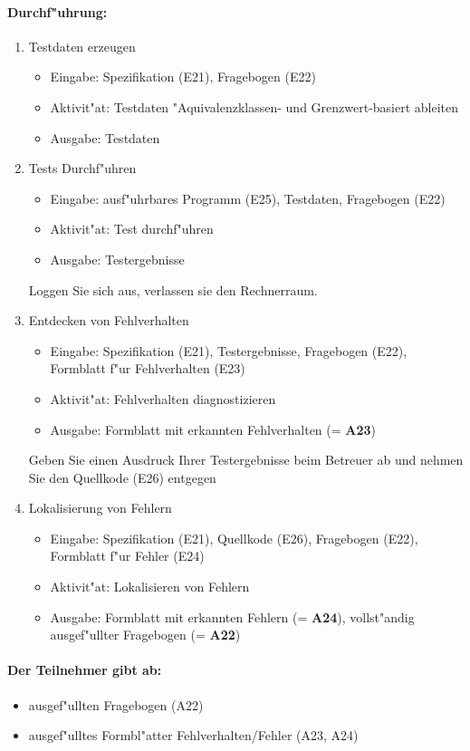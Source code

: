 \paragraph{Durchf"uhrung:} 
\begin{enumerate}
	\item Testdaten erzeugen
	\begin{itemize}
		\item Eingabe: Spezifikation (E21), Fragebogen (E22)
		\item Aktivit"at: Testdaten "Aquivalenzklassen- und Grenzwert-basiert
			ableiten
		\item Ausgabe: Testdaten
	\end{itemize}
	\item Tests Durchf"uhren
	\begin{itemize}
		\item Eingabe: ausf"uhrbares Programm (E25), Testdaten, Fragebogen (E22)
		\item Aktivit"at: Test durchf"uhren
		\item Ausgabe: Testergebnisse
	\end{itemize}
	Loggen Sie sich aus, verlassen sie den Rechnerraum.
	\item Entdecken von Fehlverhalten
	\begin{itemize}
		\item Eingabe: Spezifikation (E21), Testergebnisse, Fragebogen (E22), 
			Formblatt f"ur Fehlverhalten (E23)
		\item Aktivit"at: Fehlverhalten diagnostizieren
		\item Ausgabe: Formblatt mit erkannten Fehlverhalten (= {\bf A23})
	\end{itemize}
	Geben Sie einen Ausdruck Ihrer Testergebnisse 
	beim Betreuer ab und nehmen Sie den Quellkode (E26) entgegen
	\item Lokalisierung von Fehlern
	\begin{itemize}
		\item Eingabe: Spezifikation (E21), Quellkode (E26), 
			Fragebogen (E22), Formblatt f"ur Fehler (E24)
		\item Aktivit"at: Lokalisieren von Fehlern
		\item Ausgabe: Formblatt mit erkannten Fehlern (= {\bf A24}), 
			vollst"andig ausgef"ullter Fragebogen (= {\bf A22})
	\end{itemize}
\end{enumerate}

\paragraph{Der Teilnehmer gibt ab:}  
\begin{itemize}
	\item ausgef"ullten Fragebogen (A22)
	\item ausgef"ulltes Formbl"atter Fehlverhalten/Fehler (A23, A24)
\end{itemize}

